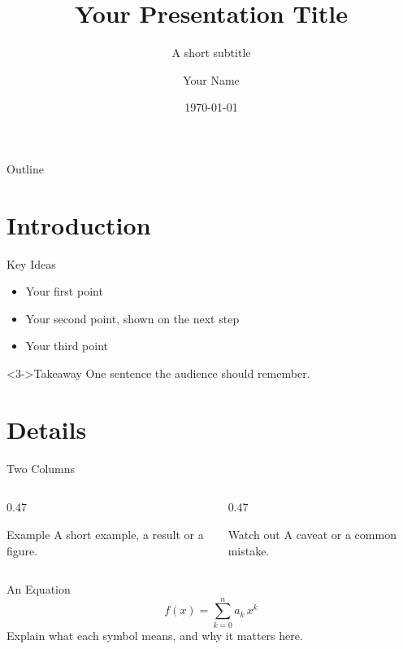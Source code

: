 \documentclass[aspectratio=169]{beamer}
\title{Your Presentation Title}
\subtitle{A short subtitle}
\author{Your Name}
\institute{Your Institution}
\date{\today}
\begin{document}
\begin{frame}
  \titlepage
\end{frame}

\begin{frame}{Outline}
  \tableofcontents
\end{frame}

\section{Introduction}
\begin{frame}{Key Ideas}
  \begin{itemize}
    \item<1-> Your first point
    \item<2-> Your second point, shown on the next step
    \item<3-> Your third point
  \end{itemize}
  \vspace{0.6em}
  \begin{block}<3->{Takeaway}
    One sentence the audience should remember.
  \end{block}
\end{frame}

\section{Details}
\begin{frame}{Two Columns}
  \begin{columns}[T]
    \begin{column}{0.47\textwidth}
      \begin{exampleblock}{Example}
        A short example, a result or a figure.
      \end{exampleblock}
    \end{column}
    \begin{column}{0.47\textwidth}
      \begin{alertblock}{Watch out}
        A caveat or a common mistake.
      \end{alertblock}
    \end{column}
  \end{columns}
\end{frame}

\begin{frame}{An Equation}
  \begin{equation*}
    f(x) = \sum_{k=0}^{n} a_k\, x^k
  \end{equation*}
  Explain what each symbol means, and why it matters here.
\end{frame}
\end{document}
